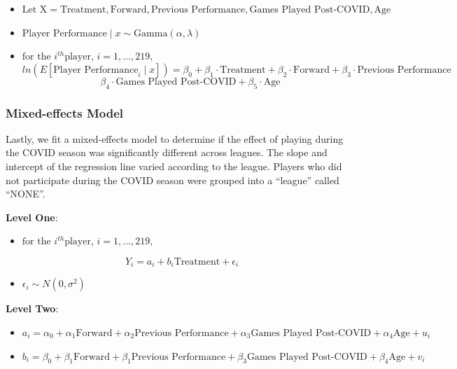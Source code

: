 \documentclass[12pt]{article}
\providecommand{\tightlist}{%
  \setlength{\itemsep}{0pt}\setlength{\parskip}{0pt}}
\begin{document}
\begin{itemize}
\tightlist
\item
  \(\text{Let X} = \text{Treatment}, \text{Forward}, \text{Previous Performance}, \text{Games Played Post-COVID}, \text{Age}\)
\item
  \(\text{Player Performance} \mid x \sim \text{Gamma}(\alpha, \lambda)\)
\item
  \(\text{for the }i^{th} \text{player, } i= 1,..., 219,\)
  \[ln(E[\text{Player Performance}_i \mid x]) =  \beta_0 + \beta_1 \cdot \text{Treatment} + \beta_2 \cdot \text{Forward} + \beta_3 \cdot \text{Previous Performance}\]
  \[ \beta_4 \cdot \text{Games Played Post-COVID} + \beta_5 \cdot \text{Age}\]
\end{itemize}

\hypertarget{mixed-effects-model}{%
\subsubsection{Mixed-effects Model}\label{mixed-effects-model}}

Lastly, we fit a mixed-effects model to determine if the effect of
playing during the COVID season was significantly different across
leagues. The slope and intercept of the regression line varied according
to the league. Players who did not participate during the COVID season
were grouped into a ``league'' called ``NONE''.

\textbf{Level One}:

\begin{itemize}
\tightlist
\item
  \(\text{for the }i^{th} \text{player, } i= 1,..., 219,\)
\end{itemize}

\[Y_i = a_i + b_i\text{Treatment} + \epsilon_i\]

\begin{itemize}
\tightlist
\item
  \(\epsilon_i \sim N(0, \sigma^2)\)
\end{itemize}

\textbf{Level Two}:

\begin{itemize}
\item
  \(a_i = \alpha_0 + \alpha_1\text{Forward} + \alpha_2\text{Previous Performance} + \alpha_3\text{Games Played Post-COVID} + \alpha_4\text{Age} + u_i\)
\item
  \(b_i = \beta_0 + \beta_1\text{Forward} + \beta_1\text{Previous Performance} + \beta_3\text{Games Played Post-COVID} + \beta_4\text{Age} + v_i\)
\end{itemize}
\end{document}
